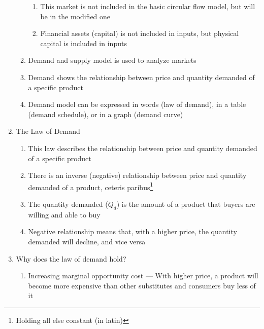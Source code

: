 \documentclass[12pt]{article}
\begin{document}
\begin{enumerate}
\begin{enumerate}
\begin{enumerate}
              \item This market is not included in the basic circular flow model, but will be in the modified one

              \item Financial assets (capital) is not included in inputs, but physical capital is included in inputs

            \end{enumerate}

          \item Demand and supply model is used to analyze markets

          \item Demand shows the relationship between price and quantity demanded of a specific product

          \item Demand model can be expressed in words (law of demand), in a table (demand schedule), or in a graph (demand curve)

        \end{enumerate}

      \item The Law of Demand

        \begin{enumerate}

          \item This law describes the relationship between price and quantity demanded of a specific product

          \item There is an inverse (negative) relationship between price and quantity demanded of a product, ceteris paribus\footnote{Holding all else constant (in latin)}

          \item The quantity demanded ($Q_d$) is the amount of a product that buyers are willing and able to buy

          \item Negative relationship means that, with a higher price, the quantity demanded will decline, and vice versa

        \end{enumerate}

      \item Why does the law of demand hold?

        \begin{enumerate}

          \item Increasing marginal opportunity cost — With higher price, a product will become more expensive than other substitutes and consumers buy less of it


\end{enumerate}
\end{enumerate}
\end{document}
